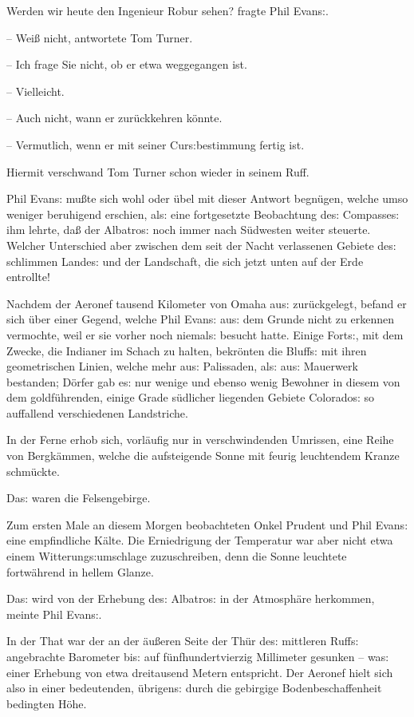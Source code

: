 \documentclass[oneside,12pt]{book}
\newcommand{\s}{s:}
\begin{document}
{\glqq}Werden wir heute den Ingenieur Robur sehen? fragte Phil Evan{\s}.

-- Wei{\ss} nicht, antwortete Tom Turner.

-- Ich frage Sie nicht, ob er etwa weggegangen ist.

-- Vielleicht.

-- Auch nicht, wann er zur\"uckkehren k\"onnte.

-- Vermutlich, wenn er mit seiner Cur{\s}bestimmung fertig ist.{\grqq}

Hiermit verschwand Tom Turner schon wieder in seinem Ruff.

Phil Evan{\s} mu{\ss}te sich wohl oder \"ubel mit dieser Antwort
begn\"ugen, welche umso weniger beruhigend erschien, al{\s} eine
fortgesetzte Beobachtung de{\s} Compasse{\s} ihm lehrte, da{\ss} der
{\glqq}Albatro{\s}{\grqq} noch immer nach S\"udwesten weiter
steuerte. Welcher Unterschied aber zwischen dem seit der Nacht
verlassenen Gebiete de{\s} schlimmen Lande{\s} und der Landschaft,
die sich jetzt unten auf der Erde entrollte!

Nachdem der Aeronef tausend Kilometer von Omaha au{\s}
zur\"uckgelegt, befand er sich \"uber einer Gegend, welche Phil
Evan{\s} au{\s} dem Grunde nicht zu erkennen vermochte, weil er sie
vorher noch niemal{\s} besucht hatte. Einige Fort{\s}, mit dem
Zwecke, die Indianer im Schach zu halten, bekr\"onten die Bluff{\s}
mit ihren geometrischen Linien, welche mehr au{\s} Palissaden, al{\s}
au{\s} Mauerwerk bestanden; D\"orfer gab e{\s} nur wenige und ebenso
wenig Bewohner in diesem von dem goldf\"uhrenden, einige Grade
s\"udlicher liegenden Gebiete Colorado{\s} so auf\/fallend
verschiedenen Landstriche.

In der Ferne erhob sich, vorl\"aufig nur in verschwindenden Umrissen,
eine Reihe von Bergk\"ammen, welche die aufsteigende Sonne mit feurig
leuchtendem Kranze schm\"uckte.

Da{\s} waren die Felsengebirge.

Zum ersten Male an diesem Morgen beobachteten Onkel Prudent und Phil
Evan{\s} eine empfindliche K\"alte. Die Erniedrigung der Temperatur
war aber nicht etwa einem Witterung{\s}umschlage zuzuschreiben, denn
die Sonne leuchtete fortw\"ahrend in hellem Glanze.

{\glqq}Da{\s} wird von der Erhebung de{\s} {\glqq}Albatro{\s}{\grqq}
in der Atmosph\"are herkommen,{\grqq} meinte Phil Evan{\s}.

In der That war der an der \"au{\ss}eren Seite der Th\"ur de{\s}
mittleren Ruff{\s} angebrachte Barometer bi{\s} auf
f\"unfhundertvierzig Millimeter gesunken -- wa{\s} einer Erhebung von
etwa dreitausend Metern entspricht. Der Aeronef hielt sich also in
einer bedeutenden, \"ubrigen{\s} durch die gebirgige
Bodenbeschaffenheit bedingten H\"ohe.
\end{document}
